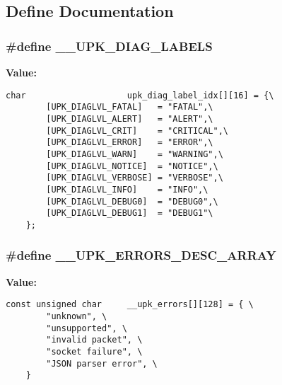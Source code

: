 \subsection{Define Documentation}
\subsubsection{\setlength{\rightskip}{0pt plus 5cm}\#define \bf{\_\-\_\-UPK\_\-DIAG\_\-LABELS}}\label{group__upk__errors_ge3df24716777b14eec390bf9ec0f1019}


\textbf{Value:}

\begin{Code}\begin{verbatim}char                    upk_diag_label_idx[][16] = {\
        [UPK_DIAGLVL_FATAL]   = "FATAL",\
        [UPK_DIAGLVL_ALERT]   = "ALERT",\
        [UPK_DIAGLVL_CRIT]    = "CRITICAL",\
        [UPK_DIAGLVL_ERROR]   = "ERROR",\
        [UPK_DIAGLVL_WARN]    = "WARNING",\
        [UPK_DIAGLVL_NOTICE]  = "NOTICE",\
        [UPK_DIAGLVL_VERBOSE] = "VERBOSE",\
        [UPK_DIAGLVL_INFO]    = "INFO",\
        [UPK_DIAGLVL_DEBUG0]  = "DEBUG0",\
        [UPK_DIAGLVL_DEBUG1]  = "DEBUG1"\
    };
\end{verbatim}\end{Code}
\subsubsection{\setlength{\rightskip}{0pt plus 5cm}\#define \bf{\_\-\_\-UPK\_\-ERRORS\_\-DESC\_\-ARRAY}}\label{group__upk__errors_gb325d5e5ff1d063c048427fd4af5b78c}


\textbf{Value:}

\begin{Code}\begin{verbatim}const unsigned char     __upk_errors[][128] = { \
        "unknown", \
        "unsupported", \
        "invalid packet", \
        "socket failure", \
        "JSON parser error", \
    }
\end{verbatim}\end{Code}
